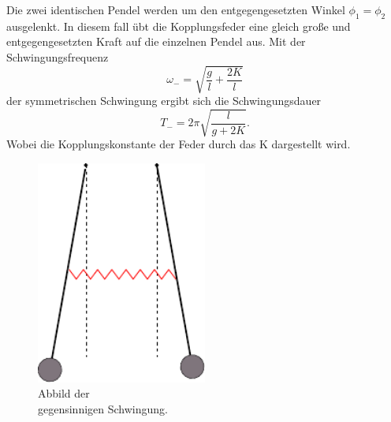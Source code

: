 \begin{minipage}[t]{0.5\textwidth}
\label{subsec:Gegen}
Die zwei identischen Pendel werden um den entgegengesetzten Winkel $\phi_1 = \phi_2$ ausgelenkt.
In diesem fall übt die Kopplungsfeder eine gleich große und entgegengesetzten Kraft auf die einzelnen Pendel aus.
Mit der Schwingungsfrequenz
\begin{equation}
    \omega_- = \sqrt{\frac{g}{l} + \frac{2K}{l}}
    \label{eqn:omega-}
\end{equation}
der symmetrischen Schwingung ergibt sich die Schwingungsdauer
\begin{equation}
    T_- = 2\pi \sqrt{\frac{l}{g+2K}}.
    \label{eqn:T-}
\end{equation}
Wobei die Kopplungskonstante der Feder durch das K dargestellt wird.
\end{minipage}
\begin{minipage}[t]{0.5\textwidth}
    \begin{figure}[H]
        \centering
        \includegraphics[width=0.5\textwidth]{build/Abb_2.pdf}
        \caption{Abbild der \\gegensinnigen Schwingung. \cite{V106}}
        \label{fig:gegen}
      \end{figure}
\end{minipage}
